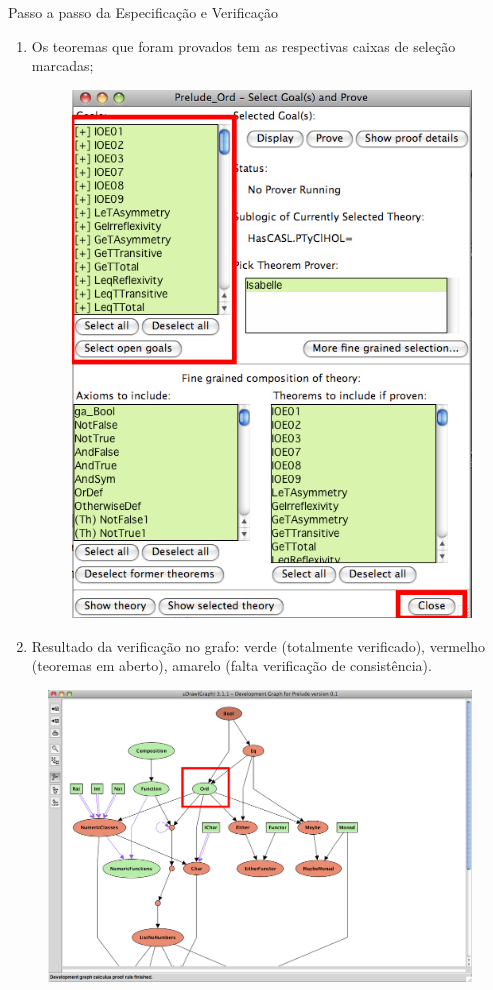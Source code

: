 \documentclass{beamer}
\begin{document}
\begin{frame}[allowframebreaks]{Passo a passo da Especificação e Verificação}
\begin{enumerate}
		\item Os teoremas que foram provados tem as respectivas caixas de seleção marcadas;
		\begin{figure}
			\includegraphics[height=0.7\textheight]{figuras/passo_a_passo/Picture08.png}
		\end{figure}
		
		\item Resultado da verificação no grafo: verde (totalmente verificado), vermelho (teoremas em aberto), amarelo (falta verificação de consistência).
	\end{enumerate}
	\begin{figure}
		\includegraphics[height=0.64\textheight]{figuras/passo_a_passo/Picture09.png}
	\end{figure}


\end{frame}
\end{document}
